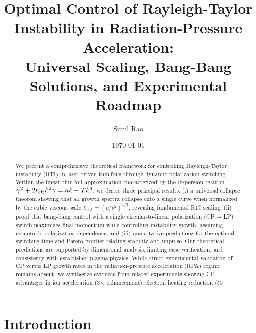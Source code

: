 \documentclass[aps,pre,twocolumn,showpacs,superscriptaddress]{revtex4-2}
\theoremstyle{definition}
\begin{document}
\title{Optimal Control of Rayleigh-Taylor Instability in Radiation-Pressure Acceleration:\\
Universal Scaling, Bang-Bang Solutions, and Experimental Roadmap}

\author{Sunil Rao}

\date{\today}

\begin{abstract}
We present a comprehensive theoretical framework for controlling Rayleigh-Taylor instability (RTI) in laser-driven thin foils through dynamic polarization switching. Within the linear thin-foil approximation characterized by the dispersion relation $\gamma^2+2\nu_{\rm eff}k^2\gamma=ak-Tk^3$, we derive three principal results: (i) a universal collapse theorem showing that all growth spectra collapse onto a single curve when normalized by the cubic viscous scale $k_{\nu,3}=(a/\nu^2)^{1/3}$, revealing fundamental RTI scaling; (ii) proof that bang-bang control with a single circular-to-linear polarization (CP$\to$LP) switch maximizes final momentum while controlling instability growth, assuming monotonic polarization dependence; and (iii) quantitative predictions for the optimal switching time and Pareto frontier relating stability and impulse. Our theoretical predictions are supported by dimensional analysis, limiting case verification, and consistency with established plasma physics. While direct experimental validation of CP versus LP growth rates in the radiation-pressure acceleration (RPA) regime remains absent, we synthesize evidence from related experiments showing CP advantages in ion acceleration (3× enhancement), electron heating reduction (50%
\end{abstract}

\maketitle

\section{Introduction}\label{sec:intro}
\end{document}
